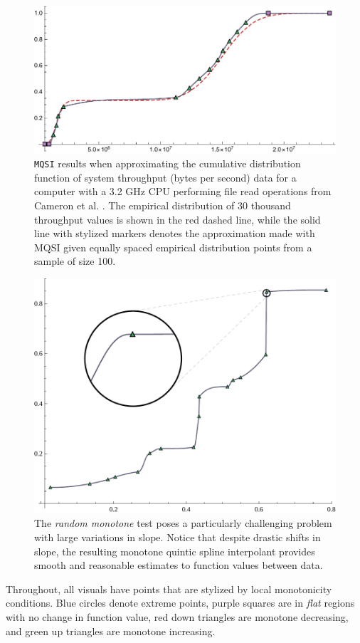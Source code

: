 \begin{figure}
  \centering
  \includegraphics[width=.7\textwidth]{Figures/TOMS/5-real-data.pdf}
\caption{{\tt MQSI} results when approximating the cumulative distribution
function of system throughput (bytes per second) data for a computer
with a 3.2 GHz CPU performing file read operations from Cameron et al.
\cite{cameron2019moana}. The empirical distribution of 30 thousand throughput values is
shown in the red dashed line, while the solid line with stylized
markers denotes the approximation made with MQSI given equally spaced
empirical distribution points from a sample of size 100.}
\label{splines:cdf}
\end{figure}


\begin{figure}
  \centering
  \includegraphics[width=.7\textwidth]{Figures/TOMS/6-random-monotone.pdf}
\caption{The {\it random monotone} test poses a particularly challenging
problem with large variations in slope. Notice that despite drastic
shifts in slope, the resulting monotone quintic spline interpolant
provides smooth and reasonable estimates to function values between data.}
\label{splines:random}
\end{figure}


Throughout, all visuals have points that are stylized by local
monotonicity conditions. Blue circles denote extreme points, purple
squares are in {\it flat} regions with no change in function value,
red down triangles are monotone decreasing, and green up triangles are
monotone increasing.


